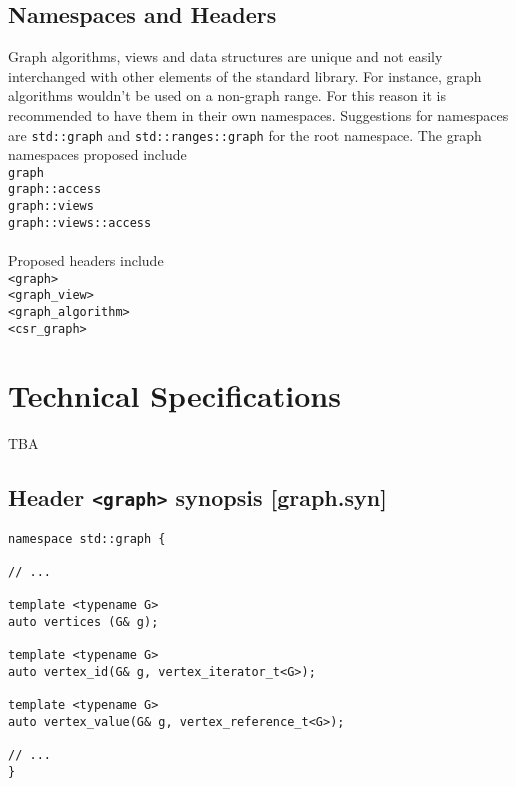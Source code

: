 \documentclass[10pt,onecolumn]{article}
\begin{document}
\subsection{Namespaces and Headers}
Graph algorithms, views and data structures are unique and not easily interchanged with other elements of the standard library. For
instance, graph algorithms wouldn't be used on a non-graph range. For this reason it is recommended to have them in their own 
namespaces. Suggestions for namespaces are \texttt{std::graph} and
\texttt{std::ranges::graph} for the root namespace. The graph namespaces proposed include
\\
\hspace*{20mm}\texttt{graph}\\
\hspace*{20mm}\texttt{graph::access}\\
\hspace*{20mm}\texttt{graph::views}\\
\hspace*{20mm}\texttt{graph::views::access}\\
\\
Proposed headers include\\
\hspace*{20mm}\texttt{<graph>}\\
\hspace*{20mm}\texttt{<graph\_view>}\\
\hspace*{20mm}\texttt{<graph\_algorithm>}\\
\hspace*{20mm}\texttt{<csr\_graph>}\\

\section{Technical Specifications}
TBA

\subsection{Header \texttt{<graph>} synopsis [graph.syn]}

\begin{lstlisting}
namespace std::graph {

// ...

template <typename G>
auto vertices (G& g);

template <typename G>
auto vertex_id(G& g, vertex_iterator_t<G>);

template <typename G>
auto vertex_value(G& g, vertex_reference_t<G>);

// ...
}
\end{lstlisting}
\end{document}
